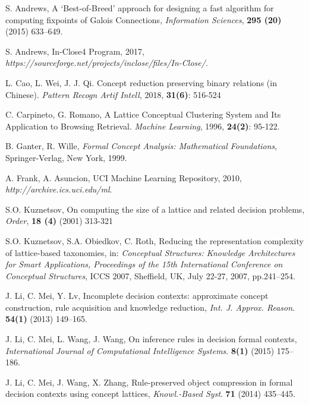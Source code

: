 \documentclass[11pt]{article}
\numberwithin{equation}{subsection}
\begin{document}
\vspace{0.2cm}
\begin{thebibliography}{aa}


S. Andrews,   A ‘Best-of-Breed’ approach for designing a fast algorithm
for computing fixpoints of Galois Connections, \textit{Information Sciences}, \textbf{295 (20)} (2015) 633--649.

S. Andrews, In-Close4 Program, 2017,
\textit{https://sourceforge.net/projects/inclose/files/In-Close/}.


L. Cao, L. Wei, J. J. Qi. Concept reduction preserving binary relations (in Chinese). \textit{Pattern Recogn Artif Intell}, 2018, \textbf{31(6)}: 516-524


C. Carpineto, G. Romano,  A Lattice Conceptual Clustering System
and Its Application to Browsing Retrieval. \textit{Machine Learning},
1996, \textbf{24(2)}: 95-122.



B. Ganter, R. Wille, \textit{Formal Concept Analysis:  Mathematical Foundations}, Springer-Verlag, New York, 1999.

A. Frank,  A. Asuncion, UCI Machine Learning Repository, 2010, \textit{http://archive.ics.uci.edu/ml}.


S.O. Kuznetsov,
On computing the size of a lattice and related decision problems,
\textit{Order}, \textbf{18 (4)} (2001) 313-321




S.O. Kuznetsov, S.A. Obiedkov, C. Roth, Reducing the representation complexity of lattice-based taxonomies, in: \textit{Conceptual Structures: Knowledge Architectures for Smart Applications, Proceedings of the 15th International Conference on Conceptual Structures}, ICCS 2007, Sheffield, UK, July 22-27, 2007,  pp.241--254.




J. Li, C. Mei, Y. Lv, Incomplete decision contexts: approximate concept construction, rule acquisition and knowledge reduction, \textit{Int. J. Approx. Reason}. \textbf{54(1)} (2013) 149--165.


 J. Li, C. Mei, L. Wang, J. Wang, On inference rules in decision formal contexts, \textit{ International Journal of Computational Intelligence Systems}. \textbf{8(1)} (2015) 175--186.

J. Li, C. Mei, J. Wang, X. Zhang, Rule-preserved object compression in formal decision contexts using concept lattices, \textit{Knowl.-Based Syst}.\textbf{ 71} (2014) 435--445.


\end{thebibliography}
\end{document}
